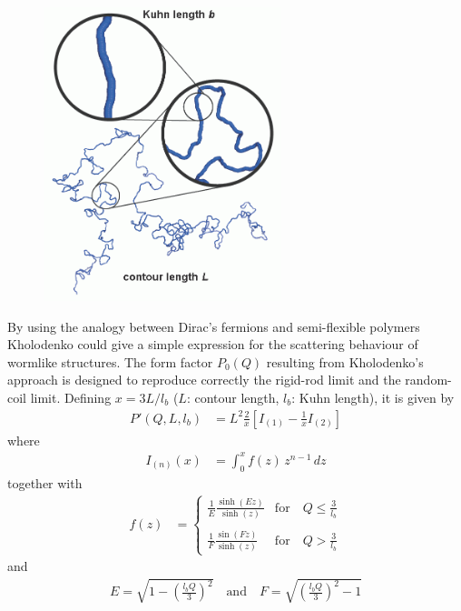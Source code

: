 \begin{figure}[htb]
\begin{center}
\includegraphics[width=0.617\textwidth,height=0.762\textwidth]{SemiflexiblePolymerTxt.png}
\end{center}
\caption{}
\label{fig:Pprime4KholodenkoWorm}
\end{figure}

By using the analogy between Dirac's fermions
and semi-flexible polymers
Kholodenko \cite{kholodenko93} could give a simple expression for the
scattering behaviour of wormlike structures. The form factor $P_0(Q)$ resulting
from Kholodenko's approach is designed to reproduce
correctly the rigid-rod limit and the random-coil limit.
Defining $x = 3L/l_b$ ($L$: contour length, $l_b$: Kuhn length), it is given by
\begin{align}
P'(Q,L,l_b) &= L^2\frac{2}{x} \left[I_{(1)} -\frac{1}{x}I_{(2)}\right]
\label{eq:KholodenkoPprime}
\end{align}
where
\begin{align}
I_{(n)}(x) &= \int_0^x  f(z) \, z^{n-1} \, dz
\end{align}
together with
\begin{align}
f(z) &=
\begin{cases} \displaystyle
\frac{1}{E}\frac{\sinh(Ez)}{\sinh(z)} & \text{for} \quad \displaystyle Q \leq \frac{3}{l_b}\\ \\
\displaystyle
\frac{1}{F}\frac{\sin(Fz)}{\sinh(z)} & \text{for} \quad \displaystyle Q > \frac{3}{l_b}
\end{cases}
\end{align}
and
\begin{align}
E = \sqrt{1-\left(\frac{l_bQ}{3}\right)^2} \quad \text{and} \quad F = \sqrt{\left(\frac{l_bQ}{3}\right)^2-1}
\end{align}

